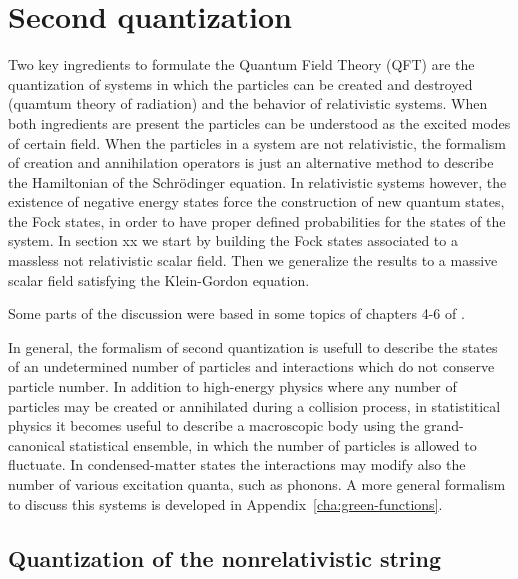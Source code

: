 \chapter{Second quantization}
\label{cha:second-quantization} %


Two key ingredients to formulate the Quantum Field Theory (QFT) are the quantization of systems in which the particles can be created and destroyed (quamtum theory of radiation) and the behavior of relativistic systems. When both ingredients are present the particles can be understood as the excited modes of certain field. When the particles in a system are not relativistic, the formalism of creation and annihilation operators is just an alternative method to describe the Hamiltonian of the Schr\"odinger equation. In relativistic systems however, the existence of negative energy states force the construction of new quantum states, the Fock states, in order to have proper defined probabilities for the states of the system. In section xx we start by building the Fock states associated to a massless not relativistic scalar field. Then we generalize the results to a massive scalar field satisfying the Klein-Gordon equation.

Some parts of the discussion were based in some topics of chapters 4-6 of \cite{Maggiore:2005qv}.


In general, the formalism of second quantization is usefull to describe the states of an undetermined number of particles and interactions which do not conserve particle number. In addition to high-energy physics where any number of particles may be created or annihilated during a collision process, in statistitical physics it becomes useful to describe a macroscopic body using the grand-canonical statistical ensemble, in which the number of particles is allowed to fluctuate. In condensed-matter states the interactions may modify also the number of various excitation quanta, such as phonons. A more general formalism to discuss this systems is developed in Appendix~\ref{cha:green-functions}.

\section{Quantization of the nonrelativistic string}
\label{sec:fock-space-real}

